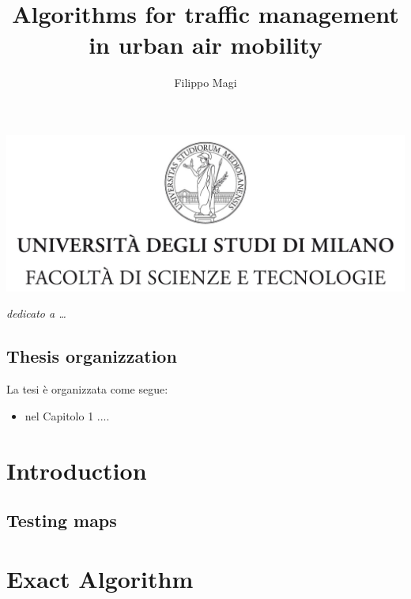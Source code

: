 \documentclass[a4paper,12pt]{report}
\begin{document}
\includegraphics{tesiSCIENZE_TECNOLOGIE.jpg}
\title{Algorithms for traffic management in urban air mobility}
\author{Filippo Magi}
%
% 
%
\beforepreface
\prefacesection{}
        {\hfill \Large {\sl dedicato a \dots}}
% 
%

%
%
\section*{Thesis organizzation}
\label{organizzazione}
La tesi \`e organizzata come segue:
\begin{itemize}
\item nel Capitolo 1 ....
\end{itemize}
% 
% 

\afterpreface
\chapter{Introduction}
\label{cap1}


%
%
\section{Testing maps}\label{sec:maps}


\chapter{Exact Algorithm}\label{chap:ExactAlgo}
%
%
\printbibliography
% 
\end{document}

